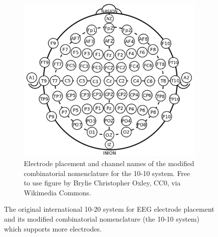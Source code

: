 \begin{figure}[ht]
    \begin{subfigure}{0.45\textwidth}
        \centering
        \includegraphics[width=\textwidth]{../images/biosignals/10-20_system_extended.pdf}
        \captionsetup{width=\linewidth}
        \captionsetup{justification=centering}
        \caption{Electrode placement and channel names of the modified combinatorial nomenclature for the 10-10 system. Free to use figure by Brylie Christopher Oxley, CC0, via Wikimedia Commons.}
        \label{fig:biomedical_signals_10_20_system_extended}
    \end{subfigure}
    \captionsetup{width=\linewidth}
    \captionsetup{justification=centering}
    \caption{The original international 10-20 system for EEG electrode placement and its modified combinatorial nomenclature (the 10-10 system) which supports more electrodes.}
    \label{fig:biomedical_signals_10_20_system}
\end{figure}

